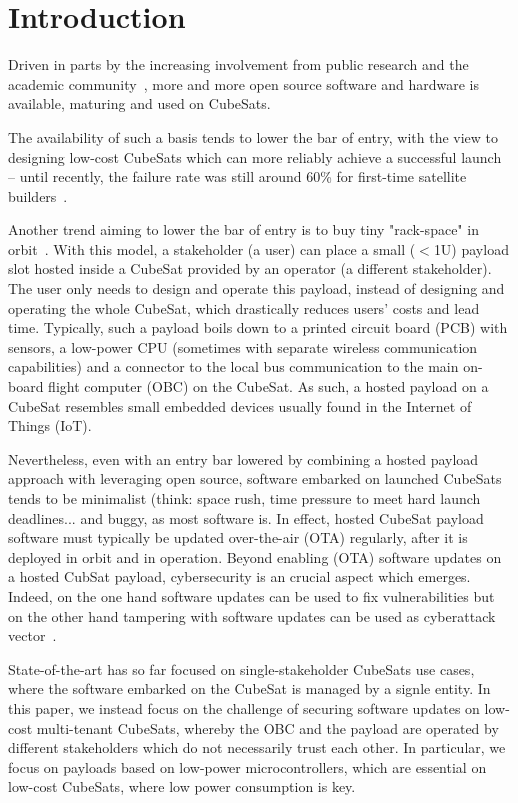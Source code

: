 \section{Introduction}
\label{sec:introduction}

Driven in parts by the increasing involvement from public research and the academic
community~\cite{cubesat101}, more and more open source software and hardware is available,
maturing and used on CubeSats.

The availability of such a basis tends to lower the bar of entry, with the view to
designing low-cost CubeSats which can more reliably achieve a successful launch --
until recently, the failure rate was still around 60\% for first-time satellite
builders~\cite{Holliday2019PyCubed}.

Another trend aiming to lower the bar of entry is to buy tiny "rack-space" in
orbit~\cite{satrevolution2020}. With this model, a stakeholder (a user) can place
a small ($<$1U) payload slot hosted inside a CubeSat provided by an operator
(a different stakeholder). The user only needs to design and operate this payload,
instead of designing and operating the whole CubeSat, which drastically reduces users'
costs and lead time. Typically, such a payload boils down to a printed circuit board
(PCB) with sensors, a low-power CPU (sometimes with separate wireless communication
capabilities) and a connector to the local bus communication to the main on-board
flight computer (OBC) on the CubeSat. As such, a hosted payload on a CubeSat
resembles small embedded devices usually found in the Internet of Things (IoT).

Nevertheless, even with an entry bar lowered by combining a hosted payload approach
with leveraging open source, software embarked on launched CubeSats tends to be
minimalist (think: space rush, time pressure to meet hard launch deadlines...
and buggy, as most software is. In effect, hosted CubeSat payload software must
typically be updated over-the-air (OTA) regularly, after it is deployed in orbit
and in operation. Beyond enabling (OTA) software updates on a hosted CubSat payload,
cybersecurity is an crucial aspect which emerges. Indeed, on the one hand software
updates can  be used to fix vulnerabilities but on the other hand tampering with
software updates can be used as cyberattack vector~\cite{ccleaner}.

State-of-the-art has so far focused on single-stakeholder CubeSats use cases, where the software embarked on the CubeSat is managed by a signle entity. In
this paper, we instead focus on the challenge of securing software updates on low-cost
multi-tenant CubeSats, whereby the OBC and the payload are operated by different
stakeholders which do not necessarily trust each other. In particular, we focus on payloads
based on low-power microcontrollers, which are essential on low-cost CubeSats, where
low power consumption is key.

